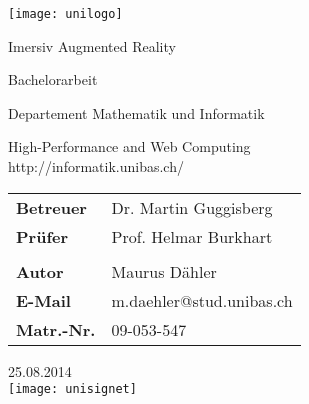
\pagestyle{empty}

\clearscrheadings\clearscrplain

\begin{center}
 \begin{flushleft}\texttt{[image: unilogo]}\end{flushleft}
\vspace{2cm}
\begin{Huge}
Imersiv Augmented Reality\\
\vspace{3mm}
\end{Huge}{\Large Bachelorarbeit}\\

\vspace{2cm}
\begin{Large}
Departement Mathematik und Informatik\\
\end{Large}
High-Performance and Web Computing\\
http://informatik.unibas.ch/\\

\vspace{1.5cm}
\begin{tabular}{ll}
{\bf Betreuer} & Dr. Martin Guggisberg\\
{\bf Prüfer} & Prof. Helmar Burkhart\\
\\
{\bf Autor} & Maurus Dähler\\
{\bf E-Mail} & m.daehler@stud.unibas.ch\\
{\bf Matr.-Nr.} & 09-053-547\\
\end{tabular}

\vspace{3cm}
25.08.2014\\
\vspace{1cm}
\texttt{[image: unisignet]}


\end{center}
\clearpage


\pagestyle{useheadings} %
\renewcommand{\baselinestretch}{1.5}\normalsize

\tableofcontents
\listoffigures

